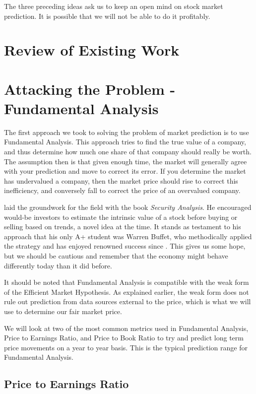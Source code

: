 \documentclass{report}
\begin{document}
The three preceding ideas ask us to keep an open mind on stock market prediction. It is possible that we will not be able to do it profitably.

\chapter{Review of Existing Work}

\chapter{Attacking the Problem - Fundamental Analysis}

The first approach we took to solving the problem of market prediction is to use Fundamental Analysis. This approach tries to find the true value of a company, and thus determine how much one share of that company should really be worth. The assumption then is that given enough time, the market will generally agree with your prediction and move to correct its error. If you determine the market has undervalued a company, then the market price should rise to correct this inefficiency, and conversely fall to correct the price of an overvalued company. 

\citet{graham1934security} laid the groundwork for the field with the book \textit{Security Analysis}. He encouraged would-be investors to estimate the intrinsic value of a stock before buying or selling based on trends, a novel idea at the time. It stands as testament to his approach that his only A+ student was Warren Buffet, who methodically applied the strategy and has enjoyed renowned success since \cite{schroeder2008snowball}. This gives us some hope, but we should be cautious and remember that the economy might behave differently today than it did before.

It should be noted that Fundamental Analysis is compatible with the weak form of the Efficient Market Hypothesis. As explained earlier, the weak form does not rule out prediction from data sources external to the price, which is what we will use to determine our fair market price.

We will look at two of the most common metrics used in Fundamental Analysis, Price to Earnings Ratio, and Price to Book Ratio to try and predict long term price movements on a year to year basis. This is the typical prediction range for Fundamental Analysis.

\section{Price to Earnings Ratio}
\end{document}
